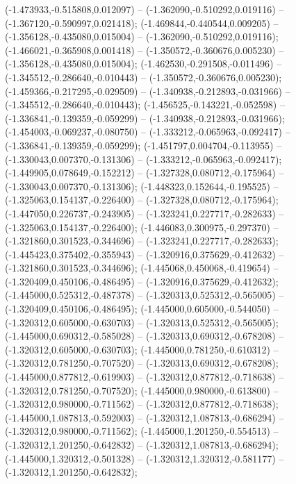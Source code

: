  (-1.473933,-0.515808,0.012097) -- (-1.362090,-0.510292,0.019116) -- (-1.367120,-0.590997,0.021418);
 (-1.469844,-0.440544,0.009205) -- (-1.356128,-0.435080,0.015004) -- (-1.362090,-0.510292,0.019116);
 (-1.466021,-0.365908,0.001418) -- (-1.350572,-0.360676,0.005230) -- (-1.356128,-0.435080,0.015004);
 (-1.462530,-0.291508,-0.011496) -- (-1.345512,-0.286640,-0.010443) -- (-1.350572,-0.360676,0.005230);
 (-1.459366,-0.217295,-0.029509) -- (-1.340938,-0.212893,-0.031966) -- (-1.345512,-0.286640,-0.010443);
 (-1.456525,-0.143221,-0.052598) -- (-1.336841,-0.139359,-0.059299) -- (-1.340938,-0.212893,-0.031966);
 (-1.454003,-0.069237,-0.080750) -- (-1.333212,-0.065963,-0.092417) -- (-1.336841,-0.139359,-0.059299);
 (-1.451797,0.004704,-0.113955) -- (-1.330043,0.007370,-0.131306) -- (-1.333212,-0.065963,-0.092417);
 (-1.449905,0.078649,-0.152212) -- (-1.327328,0.080712,-0.175964) -- (-1.330043,0.007370,-0.131306);
 (-1.448323,0.152644,-0.195525) -- (-1.325063,0.154137,-0.226400) -- (-1.327328,0.080712,-0.175964);
 (-1.447050,0.226737,-0.243905) -- (-1.323241,0.227717,-0.282633) -- (-1.325063,0.154137,-0.226400);
 (-1.446083,0.300975,-0.297370) -- (-1.321860,0.301523,-0.344696) -- (-1.323241,0.227717,-0.282633);
 (-1.445423,0.375402,-0.355943) -- (-1.320916,0.375629,-0.412632) -- (-1.321860,0.301523,-0.344696);
 (-1.445068,0.450068,-0.419654) -- (-1.320409,0.450106,-0.486495) -- (-1.320916,0.375629,-0.412632);
 (-1.445000,0.525312,-0.487378) -- (-1.320313,0.525312,-0.565005) -- (-1.320409,0.450106,-0.486495);
 (-1.445000,0.605000,-0.544050) -- (-1.320312,0.605000,-0.630703) -- (-1.320313,0.525312,-0.565005);
 (-1.445000,0.690312,-0.585028) -- (-1.320313,0.690312,-0.678208) -- (-1.320312,0.605000,-0.630703);
 (-1.445000,0.781250,-0.610312) -- (-1.320312,0.781250,-0.707520) -- (-1.320313,0.690312,-0.678208);
 (-1.445000,0.877812,-0.619903) -- (-1.320312,0.877812,-0.718638) -- (-1.320312,0.781250,-0.707520);
 (-1.445000,0.980000,-0.613800) -- (-1.320312,0.980000,-0.711562) -- (-1.320312,0.877812,-0.718638);
 (-1.445000,1.087813,-0.592003) -- (-1.320312,1.087813,-0.686294) -- (-1.320312,0.980000,-0.711562);
 (-1.445000,1.201250,-0.554513) -- (-1.320312,1.201250,-0.642832) -- (-1.320312,1.087813,-0.686294);
 (-1.445000,1.320312,-0.501328) -- (-1.320312,1.320312,-0.581177) -- (-1.320312,1.201250,-0.642832);
